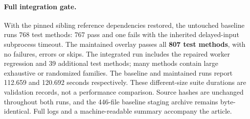 \paragraph{Full integration gate.}
With the pinned sibling reference dependencies restored, the untouched
baseline runs 768 test methods: 767 pass and one fails with the inherited
delayed-input subprocess timeout. The maintained overlay passes all
\textbf{807 test methods}, with no failures, errors or skips. The integrated
run includes the repaired worker regression and 39 additional test methods;
many methods contain large exhaustive or randomized families. The baseline
and maintained runs report 112.659 and 120.692 seconds respectively. These
different-size suite durations are validation records, not a performance
comparison. Source hashes are unchanged throughout both runs, and the
446-file baseline staging archive remains byte-identical. Full logs and a
machine-readable summary accompany the article.
